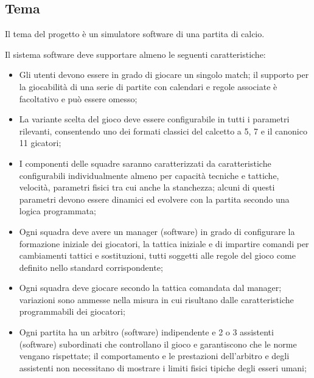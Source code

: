 \documentclass[aps,letterpaper,10pt]{article}
\begin{document}
\subsection{Tema}

Il tema del progetto \`e un simulatore software di una partita di calcio. \vspace{3mm}

Il sistema software deve supportare almeno le seguenti caratteristiche:
\begin{itemize}
	\item Gli utenti devono essere in grado di giocare un singolo match; il supporto per la giocabilit\`a di una serie di partite con calendari e regole associate \`e facoltativo e pu\`o essere omesso;
	\item La variante scelta del gioco deve essere configurabile in tutti i parametri rilevanti, consentendo uno dei formati classici del calcetto a 5, 7 e il canonico 11 gicatori;
	\item I componenti delle squadre saranno caratterizzati da caratteristiche configurabili individualmente almeno per capacit\`a tecniche e tattiche, velocit\`a, parametri fisici tra cui anche la stanchezza; alcuni di questi parametri devono essere dinamici ed evolvere con la partita secondo una logica programmata;
	\item Ogni squadra deve avere un manager (software) in grado di configurare la formazione iniziale dei giocatori, la tattica iniziale e di impartire comandi per cambiamenti tattici e sostituzioni, tutti soggetti alle regole del gioco come definito nello standard corrispondente;
	\item Ogni squadra deve giocare secondo la tattica comandata dal manager; variazioni sono ammesse nella misura in cui risultano dalle caratteristiche programmabili dei giocatori;
	\item Ogni partita ha un arbitro (software) indipendente e 2 o 3 assistenti (software) subordinati che controllano il gioco e garantiscono che le norme vengano rispettate; il comportamento e le prestazioni dell'arbitro e degli assistenti non necessitano di mostrare i limiti fisici tipiche degli esseri umani;
\end{itemize}
\end{document}
